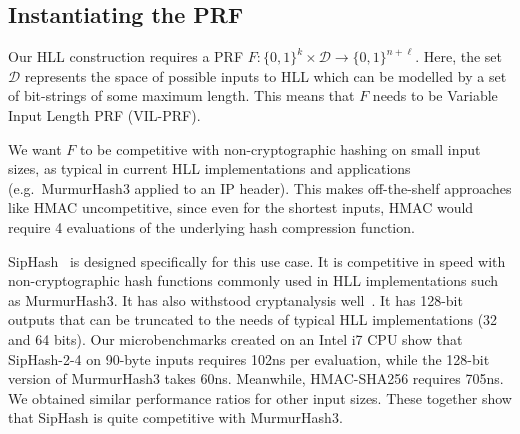 \documentclass[sigconf, anonymous, dvipsnames]{acmart} %
\begin{document}
\subsection{Instantiating the PRF}

Our HLL construction requires a PRF $F: \{0,1\}^k \times {{\mathcal{D}}} \rightarrow  \{0,1\}^{n+\ell}$. Here, the set ${{\mathcal{D}}}$ represents the space of possible inputs to HLL which can be modelled by a set of bit-strings of some maximum length. This means that $F$ needs to be Variable Input Length PRF (VIL-PRF). 

We want $F$ to be competitive with non-cryptographic hashing on small input sizes, as typical in current HLL implementations and applications (e.g.\ MurmurHash3 applied to an IP header). This makes off-the-shelf approaches like HMAC uncompetitive, since even for the shortest inputs, HMAC would require 4 evaluations of the underlying hash compression function.

SipHash~\cite{AumassonB12} is designed specifically for this use case. It is competitive in speed with non-cryptographic hash functions commonly used in HLL implementations such as MurmurHash3. It has also withstood cryptanalysis well~\cite{DobraunigMS14,XinLSL19}. It has 128-bit outputs that can be truncated to the needs of typical HLL implementations (32 and 64 bits). %
Our microbenchmarks created on an Intel i7 CPU show that SipHash-2-4 on 90-byte inputs requires 102ns per evaluation, while the 128-bit version of MurmurHash3 takes 60ns. Meanwhile, HMAC-SHA256 requires 705ns. We obtained similar performance ratios for other input sizes. These together show that SipHash is quite competitive with MurmurHash3.





\end{document}
